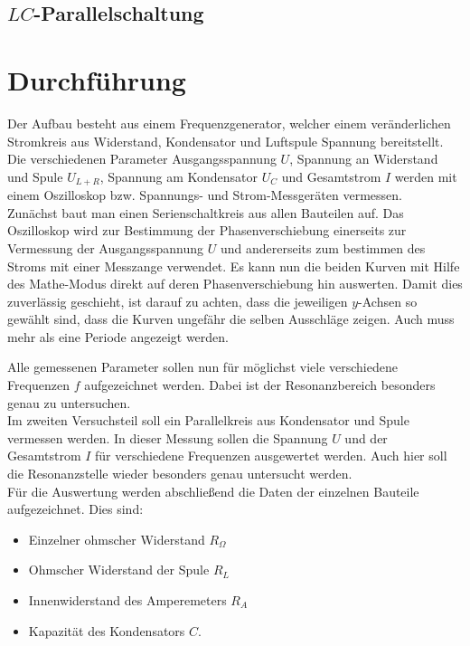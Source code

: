 \documentclass[12pt,a4paper,titlepage,headinclude,bibtotoc]{scrartcl}
\begin{document}
\subsection{$LC$-Parallelschaltung}
\label{sec:LC}

\section{Durchführung}
\label{sec:durchfuehrung}
Der Aufbau besteht aus einem Frequenzgenerator, welcher einem veränderlichen Stromkreis aus Widerstand, Kondensator und Luftspule Spannung bereitstellt.
Die verschiedenen Parameter Ausgangsspannung $U$, Spannung an Widerstand und Spule $U_{L+R}$, Spannung am Kondensator $U_C$ und Gesamtstrom $I$ werden mit einem Oszilloskop bzw. Spannungs- und Strom-Messgeräten vermessen.\\

Zunächst baut man einen Serienschaltkreis aus allen Bauteilen auf.
Das Oszilloskop wird zur Bestimmung der Phasenverschiebung einerseits zur Vermessung der Ausgangsspannung $U$ und andererseits zum bestimmen des Stroms mit einer Messzange verwendet.
Es kann nun die beiden Kurven mit Hilfe des Mathe-Modus direkt auf deren Phasenverschiebung hin auswerten.
Damit dies zuverlässig geschieht, ist darauf zu achten, dass die jeweiligen $y$-Achsen so gewählt sind, dass die Kurven ungefähr die selben Ausschläge zeigen.
Auch muss mehr als eine Periode angezeigt werden.

Alle gemessenen Parameter sollen nun für möglichst viele verschiedene Frequenzen $f$ aufgezeichnet werden.
Dabei ist der Resonanzbereich besonders genau zu untersuchen.\\

Im zweiten Versuchsteil soll ein Parallelkreis aus Kondensator und Spule vermessen werden.
In dieser Messung sollen die Spannung $U$ und der Gesamtstrom $I$ für verschiedene Frequenzen ausgewertet werden.
Auch hier soll die Resonanzstelle wieder besonders genau untersucht werden.\\

Für die Auswertung werden abschließend die Daten der einzelnen Bauteile aufgezeichnet.
Dies sind:
\begin{itemize}
\item Einzelner ohmscher Widerstand $R_\Omega$
\item Ohmscher Widerstand der Spule $R_L$
\item Innenwiderstand des Amperemeters $R_A$
\item Kapazität des Kondensators $C$.
\end{itemize}
\end{document}
